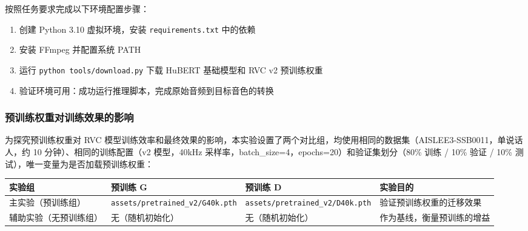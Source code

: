 \documentclass[
  english,
  letterpaper,
  DIV=11,
  numbers=noendperiod]{scrartcl}
\newcounter{none} %
\providecommand{\tightlist}{%
  \setlength{\itemsep}{0pt}\setlength{\parskip}{0pt}}
\begin{document}
按照任务要求完成以下环境配置步骤：

\begin{enumerate}
\def\labelenumi{\arabic{enumi}.}
\tightlist
\item
  创建 Python 3.10 虚拟环境，安装 \texttt{requirements.txt} 中的依赖
\item
  安装 FFmpeg 并配置系统 PATH
\item
  运行 \texttt{python\ tools/download.py} 下载 HuBERT 基础模型和 RVC v2
  预训练权重
\item
  验证环境可用：成功运行推理脚本，完成原始音频到目标音色的转换
\end{enumerate}

\subsubsection{预训练权重对训练效果的影响}\label{ux9884ux8badux7ec3ux6743ux91cdux5bf9ux8badux7ec3ux6548ux679cux7684ux5f71ux54cd}

为探究预训练权重对 RVC
模型训练效率和最终效果的影响，本实验设置了两个对比组，均使用相同的数据集（AISLEE3-SSB0011，单说话人，约
10 分钟）、相同的训练配置（v2 模型，40kHz
采样率，batch\_size=4，epochs=20）和验证集划分（80\% 训练 / 10\% 验证 /
10\% 测试），唯一变量为是否加载预训练权重：

{\def\LTcaptype{none} %
\begin{longtable}[]{@{}
  >{\raggedright\arraybackslash}p{}
  >{\raggedright\arraybackslash}p{}
  >{\raggedright\arraybackslash}p{}
  >{\raggedright\arraybackslash}p{}@{}}
\toprule\noalign{}
\begin{minipage}[b]{\linewidth}\raggedright
实验组
\end{minipage} & \begin{minipage}[b]{\linewidth}\raggedright
预训练 G
\end{minipage} & \begin{minipage}[b]{\linewidth}\raggedright
预训练 D
\end{minipage} & \begin{minipage}[b]{\linewidth}\raggedright
实验目的
\end{minipage} \\
\midrule\noalign{}
\endhead
\bottomrule\noalign{}
\endlastfoot
主实验（预训练组） & \texttt{assets/pretrained\_v2/G40k.pth} &
\texttt{assets/pretrained\_v2/D40k.pth} & 验证预训练权重的迁移效果 \\
辅助实验（无预训练组） & 无（随机初始化） & 无（随机初始化） &
作为基线，衡量预训练的增益 \\
\end{longtable}
}
\end{document}
